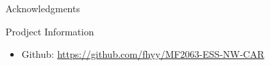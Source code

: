 \documentclass[final,hyperref={pdfpagelabels=false}]{beamer}
\begin{document}
\begin{frame}[t]
\begin{columns}[t]
\begin{column}{.465\textwidth}
\begin{block}{Acknowledgments}
\end{block}



\begin{block}{Prodject Information}

\begin{itemize}
\item Github: \href{https://github.com/fhyy/MF2063-ESS-NW-CAR}{https://github.com/fhyy/MF2063-ESS-NW-CAR}

\end{itemize}

\end{block}


\end{column} %

\begin{column}{.015\textwidth}\end{column} %

\end{columns} %

\end{frame} %
\end{document}
